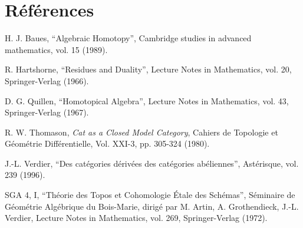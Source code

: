 \documentclass[11pt]{article}
\newcommand{\printedpage}[1]{\marginpar{\footnotesize p.~#1}}
\begin{document}
\printedpage{64}

\section*{Références}

\noindent H. J. Baues, ``Algebraic Homotopy'', Cambridge studies in advanced mathematics, vol. 15 (1989).

\noindent R. Hartshorne, ``Residues and Duality'', Lecture Notes in Mathematics, vol. 20, Springer-Verlag (1966).

\noindent D. G. Quillen, ``Homotopical Algebra'', Lecture Notes in Mathematics, vol. 43, Springer-Verlag (1967).

\noindent R. W. Thomason, \textit{Cat as a Closed Model Category}, Cahiers de Topologie et Géométrie Différentielle, Vol. XXI-3, pp. 305-324 (1980).

\noindent J.-L. Verdier, ``Des catégories dérivées des catégories abéliennes'', Astérisque, vol. 239 (1996).

\noindent SGA 4, I, ``Théorie des Topos et Cohomologie Étale des Schémas'', Séminaire de Géométrie Algébrique du Bois-Marie, dirigé par M. Artin, A. Grothendieck, J.-L. Verdier, Lecture Notes in Mathematics, vol. 269, Springer-Verlag (1972).
\end{document}
